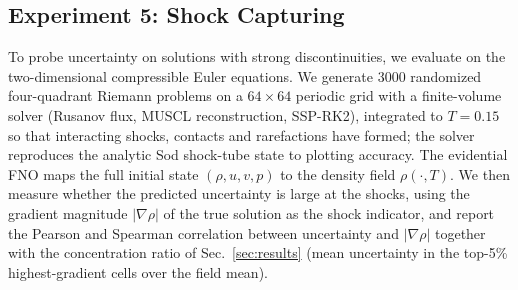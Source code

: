 
\subsection{Experiment 5: Shock Capturing}
\label{sec:exp_shock}

To probe uncertainty on solutions with strong discontinuities, we evaluate on the
two-dimensional compressible Euler equations. We generate 3000 randomized four-quadrant Riemann
problems on a $64 \times 64$ periodic grid with a finite-volume solver (Rusanov flux, MUSCL
reconstruction, SSP-RK2), integrated to $T = 0.15$ so that interacting shocks, contacts and
rarefactions have formed; the solver reproduces the analytic Sod shock-tube state to plotting
accuracy. The evidential FNO maps the full initial state $(\rho, u, v, p)$ to the density field
$\rho(\cdot, T)$. We then measure whether the predicted uncertainty is large at the shocks, using
the gradient magnitude $|\nabla \rho|$ of the true solution as the shock indicator, and report the
Pearson and Spearman correlation between uncertainty and $|\nabla \rho|$ together with the
concentration ratio of Sec.~\ref{sec:results} (mean uncertainty in the top-5\% highest-gradient
cells over the field mean).

